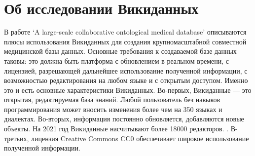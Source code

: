 \section{Об исследовании Викиданных}
В работе ‘A large-scale collaborative ontological medical database’\cite{Collaborative_ontological_database} описываются плюсы использования Викиданных для создания крупномасштабной совместной медицинской
базы данных. Основные требования к создаваемой базе данных таковы: это должна быть платформа с обновлением в реальном времени, с лицензией, разрешающей дальнейшее использование полученной информации, с возможностью редактирования на любом языке и с открытым доступом. Именно это и есть основные характеристики Викиданных. Во-первых, Викиданные — это открытая, редактируемая база знаний. Любой пользователь без навыков программирования может вносить изменения более чем на 350 языках и диалектах. Во-вторых, информация постоянно обновляется, добавляются новые объекты. На 2021 год Викиданные насчитывают более 18000 редакторов\footnotemark . . В-третьих, лицензия Creative Commons CC0 обеспечивает широкое использование полученной информации.

